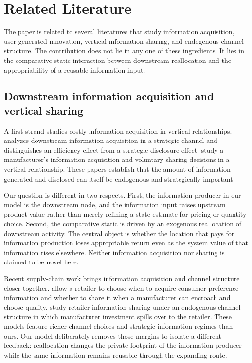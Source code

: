 \section{Related Literature}\label{sec:literature}

The paper is related to several literatures that study information acquisition, user-generated innovation, vertical information sharing, and endogenous channel structure. The contribution does not lie in any one of these ingredients. It lies in the comparative-static interaction between downstream reallocation and the appropriability of a reusable information input.

\subsection{Downstream information acquisition and vertical sharing}

A first strand studies costly information acquisition in vertical relationships. \citet{Guo2009} analyzes downstream information acquisition in a strategic channel and distinguishes an efficiency effect from a strategic disclosure effect. \citet{GuoIyer2010} study a manufacturer's information acquisition and voluntary sharing decisions in a vertical relationship. These papers establish that the amount of information generated and disclosed can itself be endogenous and strategically important.

Our question is different in two respects. First, the information producer in our model is the downstream node, and the information input raises upstream product value rather than merely refining a state estimate for pricing or quantity choice. Second, the comparative static is driven by an exogenous reallocation of downstream activity. The central object is whether the location that pays for information production loses appropriable return even as the system value of that information rises elsewhere. Neither information acquisition nor sharing is claimed to be novel here.

Recent supply-chain work brings information acquisition and channel structure closer together. \citet{HuEtAl2021} allow a retailer to choose when to acquire consumer-preference information and whether to share it when a manufacturer can encroach and choose quality. \citet{HuangChenGuan2020} study retailer information sharing under an endogenous channel structure in which manufacturer investment spills over to the retailer. These models feature richer channel choices and strategic information regimes than ours. Our model deliberately removes those margins to isolate a different feedback: reallocation changes the private footprint of the information producer while the same information remains reusable through the expanding route.


